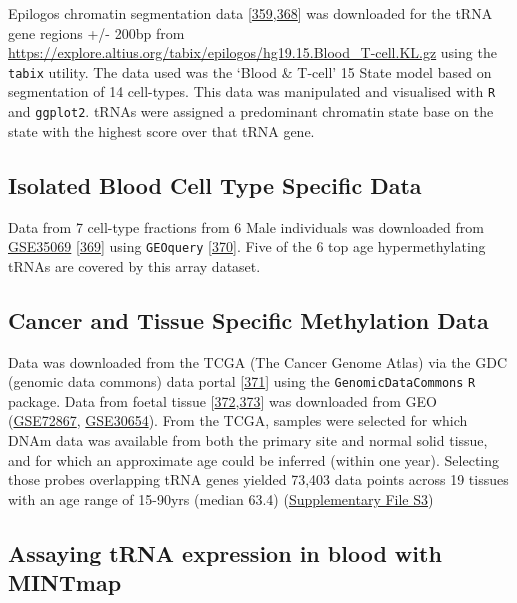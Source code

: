\documentclass[
]{book}
\begin{document}
Epilogos chromatin segmentation data {[}\protect\hyperlink{ref-Ernst2011}{359},\protect\hyperlink{ref-Meuleman2019}{368}{]} was downloaded for the tRNA gene regions +/- 200bp from \url{https://explore.altius.org/tabix/epilogos/hg19.15.Blood_T-cell.KL.gz} using the \texttt{tabix} utility.
The data used was the `Blood \& T-cell' 15 State model based on segmentation of 14 cell-types.
This data was manipulated and visualised with \texttt{R} and \texttt{ggplot2}.
tRNAs were assigned a predominant chromatin state base on the state with the highest score over that tRNA gene.

\hypertarget{sortedbloodmethods}{%
\subsection{Isolated Blood Cell Type Specific Data}\label{sortedbloodmethods}}

Data from 7 cell-type fractions from 6 Male individuals was downloaded from \href{https://www.ncbi.nlm.nih.gov/geo/query/acc.cgi?acc=GSE35069}{GSE35069} {[}\protect\hyperlink{ref-Reinius2012}{369}{]} using \texttt{GEOquery} {[}\protect\hyperlink{ref-Davis2007p}{370}{]}.
Five of the 6 top age hypermethylating tRNAs are covered by this array dataset.

\hypertarget{TCGAmethods}{%
\subsection{Cancer and Tissue Specific Methylation Data}\label{TCGAmethods}}

Data was downloaded from the TCGA (The Cancer Genome Atlas) via the GDC (genomic data commons) data portal {[}\protect\hyperlink{ref-Grossman2016}{371}{]} using the \texttt{GenomicDataCommons} \texttt{R} package.
Data from foetal tissue {[}\protect\hyperlink{ref-Yang2016}{372},\protect\hyperlink{ref-Nazor2012}{373}{]} was downloaded from GEO (\href{https://www.ncbi.nlm.nih.gov/geo/query/acc.cgi?acc=GSE72867}{GSE72867}, \href{https://www.ncbi.nlm.nih.gov/geo/query/acc.cgi?acc=GSE30654}{GSE30654}).
From the TCGA, samples were selected for which DNAm data was available from both the primary site and normal solid tissue, and for which an approximate age could be inferred (within one year).
Selecting those probes overlapping tRNA genes yielded 73,403 data points across 19 tissues with an age range of 15-90yrs (median 63.4) (\href{Supplementary_Files/TCGA_samples_used.tsv}{Supplementary File S3})

\hypertarget{mintmapmethods}{%
\subsection{Assaying tRNA expression in blood with MINTmap}\label{mintmapmethods}}
\end{document}
